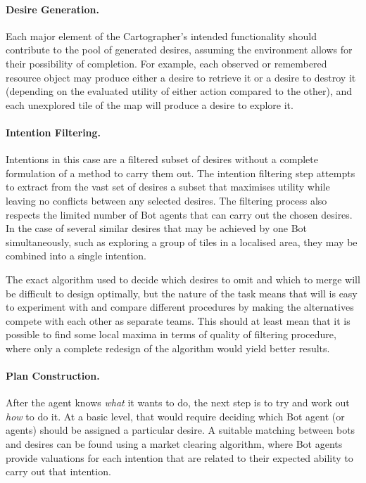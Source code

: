 \documentclass[a4paper,10pt]{article}
\begin{document}
\paragraph{Desire Generation.}
Each major element of the Cartographer's intended functionality should contribute to the pool of generated desires, assuming the environment allows for their possibility of completion. For example, each observed or remembered resource object may produce either a desire to retrieve it or a desire to destroy it (depending on the evaluated utility of either action compared to the other), and each unexplored tile of the map will produce a desire to explore it.

\paragraph{Intention Filtering.}
Intentions in this case are a filtered subset of desires without a complete formulation of a method to carry them out. The intention filtering step attempts to extract from the vast set of desires a subset that maximises utility while leaving no conflicts between any selected desires. The filtering process also respects the limited number of Bot agents that can carry out the chosen desires. In the case of several similar desires that may be achieved by one Bot simultaneously, such as exploring a group of tiles in a localised area, they may be combined into a single intention.

The exact algorithm used to decide which desires to omit and which to merge will be difficult to design optimally, but the nature of the task means that will is easy to experiment with and compare different procedures by making the alternatives compete with each other as separate teams. This should at least mean that it is possible to find some local maxima in terms of quality of filtering procedure, where only a complete redesign of the algorithm would yield better results.

\paragraph{Plan Construction.}
After the agent knows \emph{what} it wants to do, the next step is to try and work out \emph{how} to do it. At a basic level, that would require deciding which Bot agent (or agents) should be assigned a particular desire. A suitable matching between bots and desires can be found using a market clearing algorithm\cite{easley10}, where Bot agents provide valuations for each intention that are related to their expected ability to carry out that intention.
\end{document}
